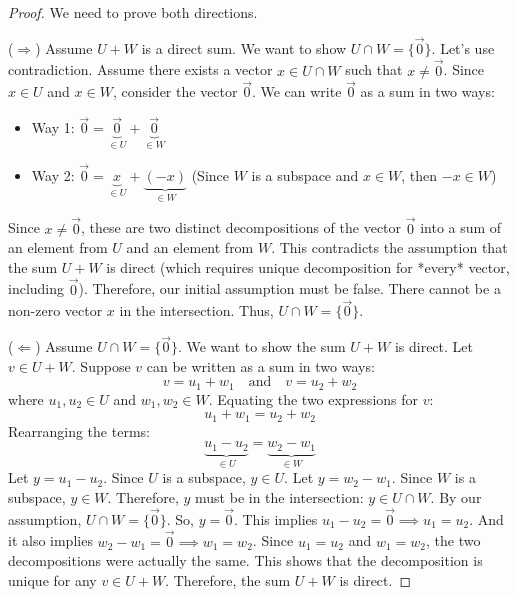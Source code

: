 \documentclass[11pt]{article}
\theoremstyle{definition}
\theoremstyle{remark}
\newcommand{\intersect}{\cap}
\begin{document}
\begin{proof}
We need to prove both directions.

($\Rightarrow$) Assume $U+W$ is a direct sum. We want to show $U \intersect W = \{\vec{0}\}$.
Let's use contradiction. Assume there exists a vector $x \in U \intersect W$ such that $x \neq \vec{0}$.
Since $x \in U$ and $x \in W$, consider the vector $\vec{0}$. We can write $\vec{0}$ as a sum in two ways:
\begin{itemize}
    \item Way 1: $\vec{0} = \underbrace{\vec{0}}_{\in U} + \underbrace{\vec{0}}_{\in W}$
    \item Way 2: $\vec{0} = \underbrace{x}_{\in U} + \underbrace{(-x)}_{\in W}$ (Since $W$ is a subspace and $x \in W$, then $-x \in W$)
\end{itemize}
Since $x \neq \vec{0}$, these are two distinct decompositions of the vector $\vec{0}$ into a sum of an element from $U$ and an element from $W$. This contradicts the assumption that the sum $U+W$ is direct (which requires unique decomposition for *every* vector, including $\vec{0}$).
Therefore, our initial assumption must be false. There cannot be a non-zero vector $x$ in the intersection. Thus, $U \intersect W = \{\vec{0}\}$.

($\Leftarrow$) Assume $U \intersect W = \{\vec{0}\}$. We want to show the sum $U+W$ is direct.
Let $v \in U+W$. Suppose $v$ can be written as a sum in two ways:
\[ v = u_1 + w_1 \quad \text{and} \quad v = u_2 + w_2 \]
where $u_1, u_2 \in U$ and $w_1, w_2 \in W$.
Equating the two expressions for $v$:
\[ u_1 + w_1 = u_2 + w_2 \]
Rearranging the terms:
\[ \underbrace{u_1 - u_2}_{\in U} = \underbrace{w_2 - w_1}_{\in W} \]
Let $y = u_1 - u_2$. Since $U$ is a subspace, $y \in U$.
Let $y = w_2 - w_1$. Since $W$ is a subspace, $y \in W$.
Therefore, $y$ must be in the intersection: $y \in U \intersect W$.
By our assumption, $U \intersect W = \{\vec{0}\}$. So, $y = \vec{0}$.
This implies $u_1 - u_2 = \vec{0} \implies u_1 = u_2$.
And it also implies $w_2 - w_1 = \vec{0} \implies w_1 = w_2$.
Since $u_1=u_2$ and $w_1=w_2$, the two decompositions were actually the same. This shows that the decomposition is unique for any $v \in U+W$.
Therefore, the sum $U+W$ is direct.
\end{proof}
\end{document}
